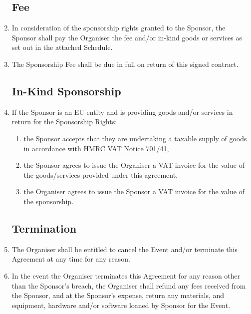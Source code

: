 \begin{enumerate}
\subsection*{Fee}

\item In consideration of the sponsorship rights granted to the Sponsor, the Sponsor shall
pay the Organiser the fee and/or in-kind goods or services as set out in the attached Schedule.

\item The Sponsorship Fee shall be due in full on return of this signed contract.


\subsection*{In-Kind Sponsorship}

\item If the Sponsor is an EU entity and is providing goods and/or services in return for the
      Sponsorship Rights:
\begin{enumerate}
      \item the Sponsor accepts that they are undertaking a taxable supply of goods in accordance with
      \href{https://www.gov.uk/government/publications/vat-notice-70141-sponsorship/vat-notice-70141-sponsorship}{HMRC VAT Notice 701/41},
      \item the Sponsor agrees to issue the Organiser a VAT invoice for the value of the
            goods/services provided under this agreement,
      \item the Organiser agrees to issue the Sponsor a VAT invoice for the value of the sponsorship.
\end{enumerate}

\subsection*{Termination}

\item The Organiser shall be entitled to cancel the Event and/or terminate this Agreement at any
time for any reason.
\item In the event the Organiser terminates this Agreement for any reason other than the Sponsor's
breach, the Organiser shall refund any fees received from the Sponsor, and at the Sponsor's expense,
return any materials, and equipment, hardware and/or software loaned by Sponsor for the Event.


\end{enumerate}
